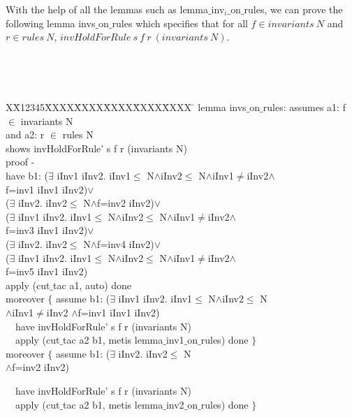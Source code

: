 \documentclass[final]{IEEEtran}
\newlength{\fminilength}
\newenvironment{fmini}[1][\linewidth]
  {\setlength{\fminilength}{#1\fboxsep-2\fboxrule}%
   \vspace{2ex}\noindent\begin{lrbox}{\fminibox}\begin{minipage}{\fminilength}%
   \mbox{ }\hfill\vspace{-2.5ex}}%
  {\end{minipage}\end{lrbox}\vspace{1ex}\hspace{0ex}%
   \framebox{\usebox{\fminibox}}}
\newenvironment{specification}
{\noindent\scriptsize
\tt\begin{fmini}\begin{tabbing}X\=X12345\=XXXX\=XXXX\=XXXX\=XXXX\=XXXX
\=\+\kill} {\end{tabbing}\normalfont\end{fmini}}
\def \twoSpaces {\ \ }
\def \iInv {iInv}
\begin{document}
With the help of all the lemmas such as {\sf lemma$\_$inv$_i\_$on$\_$rules},  we can prove the following lemma  {\sf invs$\_$on$\_$rules} which
specifies that for all $f \in invariants~ N$ and $r \in rules~ N$,   $invHoldForRule ~s~ f~ r~ (invariants~ N)$.

\begin{specification}
lemma invs$\_$on$\_$rules:
assumes a1:
f $\in$ invariants N \\
 and a2:
r $\in$ rules N\\
shows
invHoldForRule' s f r (invariants N)\\

  proof -\\
  have b1:
($\exists$ \iInv1 \iInv2. \iInv1$\le$
N$\wedge$\iInv2$\le$
N$\wedge$\iInv1$\neq$\iInv2$\wedge$\\
f=inv1  \iInv1 \iInv2)$\vee$\\
    ($\exists$ \iInv2. \iInv2$\le$
N$\wedge$f=inv2  \iInv2)$\vee$\\
    ($\exists$ \iInv1 \iInv2. \iInv1$\le$
N$\wedge$\iInv2$\le$
N$\wedge$\iInv1$\neq$\iInv2$\wedge$\\
f=inv3  \iInv1 \iInv2)$\vee$\\
    ($\exists$ \iInv2. \iInv2$\le$
N$\wedge$f=inv4  \iInv2)$\vee$\\
    ($\exists$ \iInv1 \iInv2. \iInv1$\le$
N$\wedge$\iInv2$\le$
N$\wedge$\iInv1$\neq$\iInv2$\wedge$\\
f=inv5  \iInv1 \iInv2)\\

  apply (cut$\_$tac a1, auto) done\\
    moreover $\{$      assume b1:
($\exists$ \iInv1 \iInv2. \iInv1$\le$
N$\wedge$\iInv2$\le$ N \\
$\wedge$\iInv1$\neq$\iInv2
$\wedge$f=inv1  \iInv1 \iInv2)\\

\twoSpaces       have
invHoldForRule' s f r (invariants N)\\

\twoSpaces      apply (cut$\_$tac a2 b1, metis lemma$\_$inv1$\_$on$\_$rules) done
    $\}$\\


    moreover $\{$ assume b1:
($\exists$ \iInv2. \iInv2$\le$ N\\
$\wedge$f=inv2  \iInv2)

\twoSpaces       have invHoldForRule' s f r (invariants N)\\

\twoSpaces      apply (cut$\_$tac a2 b1, metis lemma$\_$inv2$\_$on$\_$rules) done
    $\}$\\



\end{specification}
\end{document}
